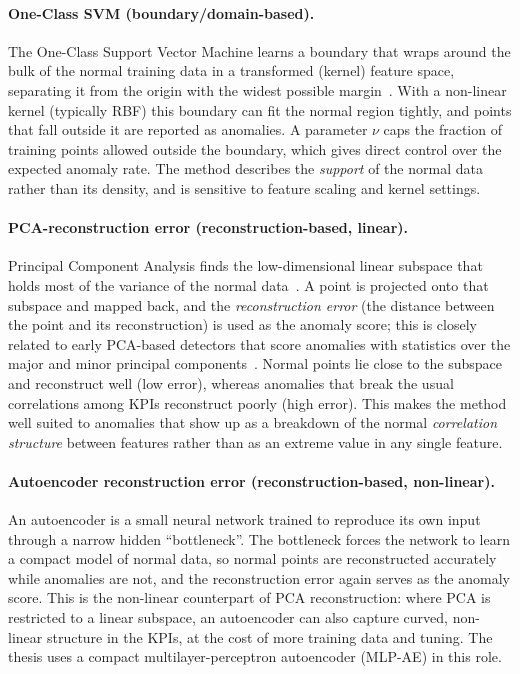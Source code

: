 \paragraph{One-Class SVM (boundary/domain-based).}
The One-Class Support Vector Machine learns a boundary that wraps around the bulk
of the normal training data in a transformed (kernel) feature space, separating
it from the origin with the widest possible margin~\cite{scholkopf2001ocsvm}. With
a non-linear kernel (typically RBF) this boundary can fit the normal region
tightly, and points that fall outside it are reported as anomalies. A parameter
$\nu$ caps the fraction of training points allowed outside the boundary, which
gives direct control over the expected anomaly rate. The method describes the
\emph{support} of the normal data rather than its density, and is sensitive to
feature scaling and kernel settings.

\paragraph{PCA-reconstruction error (reconstruction-based, linear).}
Principal Component Analysis finds the low-dimensional linear subspace that holds
most of the variance of the normal data~\cite{jolliffe2002pca}. A point is
projected onto that subspace and mapped back, and the \emph{reconstruction error}
(the distance between the point and its reconstruction) is used as the anomaly
score; this is closely related to early PCA-based detectors that score anomalies
with statistics over the major and minor principal
components~\cite{shyu2003pca}. Normal points lie close to the subspace and reconstruct
well (low error), whereas anomalies that break the usual correlations among KPIs
reconstruct poorly (high error). This makes the method well suited to anomalies
that show up as a breakdown of the normal \emph{correlation structure} between
features rather than as an extreme value in any single feature.

\paragraph{Autoencoder reconstruction error (reconstruction-based, non-linear).}
An autoencoder is a small neural network trained to reproduce its own input
through a narrow hidden ``bottleneck''. The bottleneck forces the network to learn
a compact model of normal data, so normal points are reconstructed accurately
while anomalies are not, and the reconstruction error again serves as the anomaly
score. This is the non-linear counterpart of PCA reconstruction: where PCA is
restricted to a linear subspace, an autoencoder can also capture curved,
non-linear structure in the KPIs, at the cost of more training data and tuning.
The thesis uses a compact multilayer-perceptron autoencoder (MLP-AE) in this
role.

